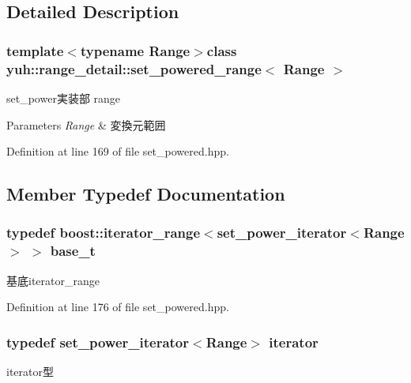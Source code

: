 \subsection{\-Detailed \-Description}
\subsubsection*{template$<$typename Range$>$class yuh\-::range\-\_\-detail\-::set\-\_\-powered\-\_\-range$<$ Range $>$}

set\-\_\-power実装部 range 
\begin{DoxyParams}{\-Parameters}
{\em \-Range} & 変換元範囲 \\
\hline
\end{DoxyParams}


\-Definition at line 169 of file set\-\_\-powered.\-hpp.



\subsection{\-Member \-Typedef \-Documentation}
\hypertarget{classyuh_1_1range__detail_1_1set__powered__range_acdc8cc49179ebf63d25a40ae97f01984}{
\subsubsection[{base\-\_\-t}]{\setlength{\rightskip}{0pt plus 5cm}typedef boost\-::iterator\-\_\-range$<${\bf set\-\_\-power\-\_\-iterator}$<$\-Range$>$ $>$ {\bf base\-\_\-t}}}\label{df/db5/classyuh_1_1range__detail_1_1set__powered__range_acdc8cc49179ebf63d25a40ae97f01984}
基底iterator\-\_\-range 

\-Definition at line 176 of file set\-\_\-powered.\-hpp.

\hypertarget{classyuh_1_1range__detail_1_1set__powered__range_afd07d63ef4b23b42b911b7a03f982529}{
\subsubsection[{iterator}]{\setlength{\rightskip}{0pt plus 5cm}typedef {\bf set\-\_\-power\-\_\-iterator}$<$\-Range$>$ {\bf iterator}}}\label{df/db5/classyuh_1_1range__detail_1_1set__powered__range_afd07d63ef4b23b42b911b7a03f982529}
iterator型 


